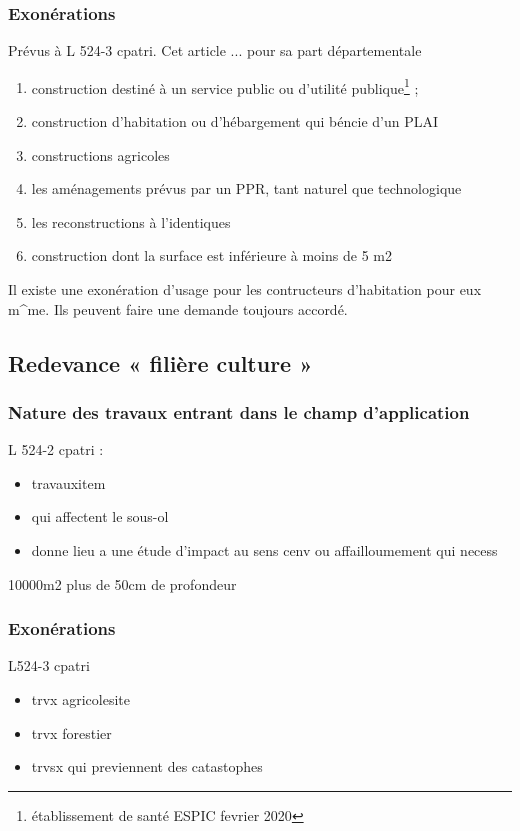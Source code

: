     \subsubsection{Exonérations}

      Prévus à L 524-3 cpatri. Cet article ... pour sa part départementale
      \begin{enumerate}
        \item construction destiné à un service public ou d'utilité publique\footnote{établissement de santé ESPIC fevrier 2020} ;
        \item construction d'habitation ou d'hébargement qui béncie d'un PLAI
        \item constructions agricoles
        \item les aménagements prévus par un PPR, tant naturel que technologique
        \item les reconstructions à l'identiques
        \item construction dont la surface est inférieure à moins de 5 m2
      \end{enumerate}
      Il existe une exonération d'usage pour les contructeurs d'habitation pour eux m^me. Ils peuvent faire une demande toujours accordé.

  \subsection{Redevance « filière culture »}

    \subsubsection{Nature des travaux entrant dans le champ d’application}

      L 524-2 cpatri :
      \begin{itemize}
        \item travauxitem
        \item qui affectent le sous-ol
        \item donne lieu a une étude d'impact au sens cenv ou affailloumement qui necess
      \end{itemize}
      10000m2 plus de 50cm de profondeur

    \subsubsection{Exonérations}

      L524-3 cpatri
      \begin{itemize}
        \item trvx agricolesite
        \item trvx forestier
        \item trvsx qui previennent des catastophes
      \end{itemize}

